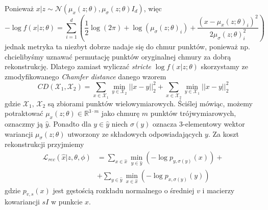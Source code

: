 \documentclass[12pt]{extarticle}
\begin{document}
Ponieważ $x|z \sim \mathcal{N}(\mu_x(z; \theta), \mu_\sigma(z;\theta)I_d)$, więc
$$
-\log f(x|z;\theta)=\sum_{i=1}^d \left( \frac{1}{2}\log(2\pi) +\log(\mu_\sigma(z;\theta)_i)
+\frac{(x-\mu_x(z;\theta)_i)^2}{2\mu_\sigma(z;\theta)_i^2} \right)
$$
jednak metryka ta niezbyt dobrze nadaje się do chmur punktów, ponieważ np.
chcielibyśmy uznawać permutację punktów oryginalnej chmury za dobrą rekonstrukcję.
Dlatego zamiast wyliczać \textit{stricte} $\log f(x|z;\theta)$ skorzystamy ze zmodyfikowanego
\textit{Chamfer distance} danego wzorem
\begin{equation}
CD(\mathcal{X}_1,\mathcal{X}_2) = \sum_{x \in \mathcal{X}_1} \min_{y \in \mathcal{X}_2} ||x-y||_2^2
+ \sum_{x \in \mathcal{X}_2} \min_{y \in \mathcal{X}_1} ||x-y||_2^2
\label{eq:chamfer_distance}
\end{equation}
gdzie $\mathcal{X}_1,\,\mathcal{X}_2$ są zbiorami punktów wielowymiarowych.
Ściślej mówiąc, możemy potraktować $\mu_x(z;\theta) \in \mathbb{R}^{3 \cdotp m}$ jako chmurę
$m$ punktów trójwymiarowych, oznaczmy ją $\hat{y}$. Ponadto dla $y \in \hat{y}$ niech
$\sigma(y)$ oznacza 3-elementowy wektor wariancji $\mu_\sigma(z;\theta)$ utworzony ze
składowych odpowiadających $y$. Za koszt rekonstrukcji przyjmiemy
\begin{equation}
\begin{split}
\mathcal{L}_{rec}(\hat{x}|z,\theta,\phi) &= \sum_{x \in \hat{x}} \min_{y \in \hat{y}}
\left( -\log p_{y,\sigma(y)}(x) \right) +\\
&+ \sum_{y \in \hat{y}} \min_{x \in \hat{x}} \left( -\log p_{x,\sigma(y)}(y) \right)
\end{split}
\end{equation}
gdzie $p_{v,s}(x)$ jest gęstością rozkładu normalnego o średniej $v$ i macierzy kowariancji
$sI$ w punkcie $x$.
\end{document}
